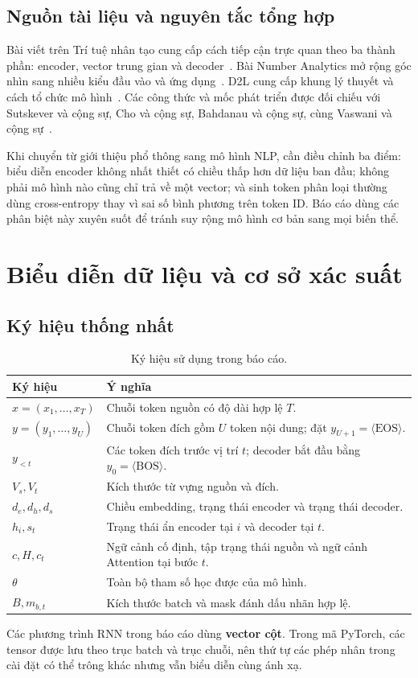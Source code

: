 \documentclass[11pt,a4paper]{article}
\numberwithin{equation}{section}
\newcommand{\BOS}{\langle\mathrm{BOS}\rangle}
\newcommand{\EOS}{\langle\mathrm{EOS}\rangle}
\begin{document}
\subsection{Nguồn tài liệu và nguyên tắc tổng hợp}
Bài viết trên Trí tuệ nhân tạo cung cấp cách tiếp cận trực quan theo ba thành phần: encoder, vector trung gian và decoder~\cite{tritue}. Bài Number Analytics mở rộng góc nhìn sang nhiều kiểu đầu vào và ứng dụng~\cite{numberanalytics}. D2L cung cấp khung lý thuyết và cách tổ chức mô hình~\cite{d2larch}. Các công thức và mốc phát triển được đối chiếu với Sutskever và cộng sự, Cho và cộng sự, Bahdanau và cộng sự, cùng Vaswani và cộng sự~\cite{sutskever,cho,bahdanau,vaswani}.

Khi chuyển từ giới thiệu phổ thông sang mô hình NLP, cần điều chỉnh ba điểm: biểu diễn encoder không nhất thiết có chiều thấp hơn dữ liệu ban đầu; không phải mô hình nào cũng chỉ trả về một vector; và sinh token phân loại thường dùng cross-entropy thay vì sai số bình phương trên token ID. Báo cáo dùng các phân biệt này xuyên suốt để tránh suy rộng mô hình cơ bản sang mọi biến thể.

\section{Biểu diễn dữ liệu và cơ sở xác suất}
\subsection{Ký hiệu thống nhất}
\begin{table}[H]
\centering\small
\begin{tabularx}{\linewidth}{@{}p{3cm}Y@{}}
\toprule{}Ký hiệu & Ý nghĩa\\\midrule
$x=(x_1,\ldots,x_T)$ & Chuỗi token nguồn có độ dài hợp lệ $T$.\\
$y=(y_1,\ldots,y_U)$ & Chuỗi token đích gồm $U$ token nội dung; đặt $y_{U+1}=\EOS$.\\
$y_{<t}$ & Các token đích trước vị trí $t$; decoder bắt đầu bằng $y_0=\BOS$.\\
$V_s,V_t$ & Kích thước từ vựng nguồn và đích.\\
$d_e,d_h,d_s$ & Chiều embedding, trạng thái encoder và trạng thái decoder.\\
$h_i,s_t$ & Trạng thái ẩn encoder tại $i$ và decoder tại $t$.\\
$c,H,c_t$ & Ngữ cảnh cố định, tập trạng thái nguồn và ngữ cảnh Attention tại bước $t$.\\
$\theta$ & Toàn bộ tham số học được của mô hình.\\
$B,m_{b,t}$ & Kích thước batch và mask đánh dấu nhãn hợp lệ.\\
\bottomrule
\end{tabularx}
\caption{Ký hiệu sử dụng trong báo cáo.}
\end{table}
Các phương trình RNN trong báo cáo dùng \textbf{vector cột}. Trong mã PyTorch, các tensor được lưu theo trục batch và trục chuỗi, nên thứ tự các phép nhân trong cài đặt có thể trông khác nhưng vẫn biểu diễn cùng ánh xạ.
\end{document}
